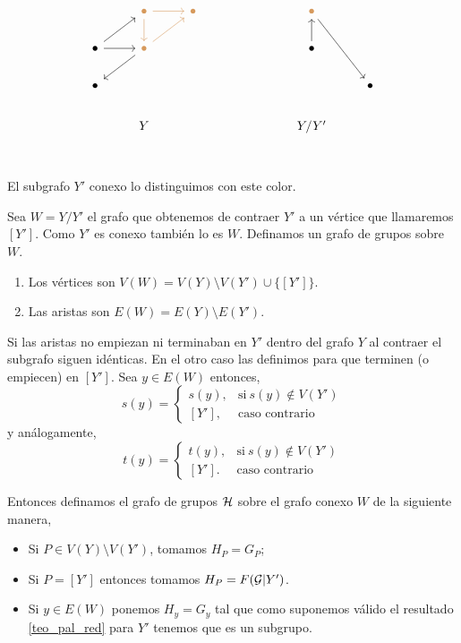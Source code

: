 \documentclass[tesis.tex]{subfiles}
\newcommand{\cG}{ {\cal G} }
\begin{document}
\[\begin{tikzcd}
	& \color{rgb,255:red,214;green,153;blue,92}\bullet &  \color{rgb,255:red,214;green,153;blue,92} \bullet &&&  \color{rgb,255:red,214;green,153;blue,92} \bullet \\
	\bullet & \color{rgb,255:red,214;green,153;blue,92} \bullet &&&& \bullet \\
	\bullet &&&&&& \bullet \\
	& Y &&&& Y/Y' \\ 	
	\arrow[color={rgb,255:red,214;green,153;blue,92}, from=1-2, to=1-3]
	\arrow[color={rgb,255:red,214;green,153;blue,92}, from=1-2, to=2-2]
	\arrow[color={rgb,255:red,214;green,153;blue,92}, from=2-2, to=1-3]
	\arrow[from=2-1, to=1-2]
	\arrow[from=2-1, to=2-2]
	\arrow[from=2-2, to=3-1]
	\arrow[from=1-6, to=3-7]
	\arrow[from=2-6, to=1-6]
\end{tikzcd}\]
El subgrafo $Y'$ conexo lo distinguimos con este \textcolor{rgb,255:red,214;green,153;blue,92}{color}.

Sea $W = Y / Y'$  el grafo que obtenemos de contraer $Y'$ a un vértice que llamaremos $[Y']$. 
Como $Y'$ es conexo también lo es $W$.
Definamos un grafo de grupos sobre $W$.

\begin{enumerate}
	\item Los vértices son $V(W)= V(Y) \setminus V(Y') \cup \{ [Y'] \}$.
	\item Las aristas son $E(W) = E(Y) \setminus E(Y')$.
\end{enumerate}

Si las aristas no empiezan ni terminaban en $Y'$ dentro del grafo $Y$ al contraer el subgrafo siguen idénticas. 
En el otro caso las definimos para que terminen (o empiecen) en $[Y']$. Sea $y \in E(W)$ entonces,
\begin{equation*}
	s(y) = 
	\begin{cases}
	s(y),  & \text{si} \ s(y) \notin V(Y') \\ 
	[Y'], & \text{caso contrario}
	\end{cases}
\end{equation*}
y análogamente,
\begin{equation*}
	t(y) = 
	\begin{cases}
		t(y),  & \text{si} \ s(y) \notin V(Y') \\ 
		[Y']. & \text{caso contrario}
	\end{cases}
\end{equation*}


Entonces definamos el grafo de grupos $\cal H$ sobre el grafo conexo $W$ de la siguiente manera,
\begin{itemize}
	\item Si $P \in V(Y) \setminus V(Y')$, tomamos $H_P = G_P$;
	\item Si $P = [Y']$ entonces tomamos $H_P = F(\cG | Y')$.
	\item Si $y \in E(W)$ ponemos $H_y = G_y$ tal que como suponemos válido el resultado \ref{teo_pal_red} para $Y'$ tenemos que es un subgrupo.
\end{itemize}
\end{document}
